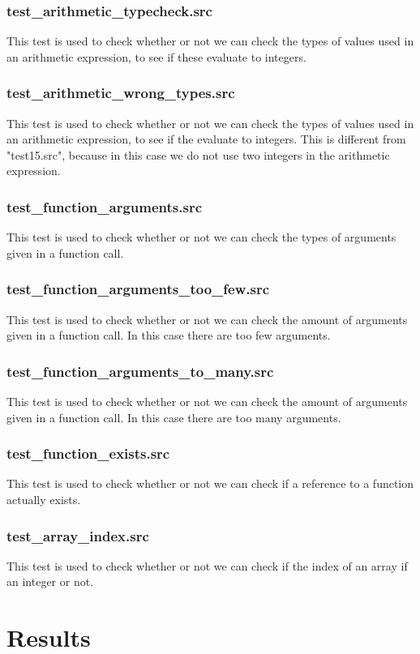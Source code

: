 \documentclass[a4paper,10pt,titlepage]{report}
\begin{document}
\subsubsection{test\_arithmetic\_typecheck.src}
This test is used to check whether or not we can check the types of values used in an arithmetic expression, to see if these evaluate to integers.
\subsubsection{test\_arithmetic\_wrong\_types.src}
This test is used to check whether or not we can check the types of values used in an arithmetic expression, to see if the evaluate to integers. This is different from "test15.src", because in this case we do not use two integers in the arithmetic expression.
\subsubsection{test\_function\_arguments.src}
This test is used to check whether or not we can check the types of arguments given in a function call. 
\subsubsection{test\_function\_arguments\_too\_few.src}
This test is used to check whether or not we can check the amount of arguments given in a function call. In this case there are too few arguments.
\subsubsection{test\_function\_arguments\_to\_many.src}
This test is used to check whether or not we can check the amount of arguments given in a function call. In this case there are too many arguments.
\subsubsection{test\_function\_exists.src}
This test is used to check whether or not we can check if a reference to a function actually exists.
\subsubsection{test\_array\_index.src}
This test is used to check whether or not we can check if the index of an array if an integer or not.


\section{Results}
\end{document}
